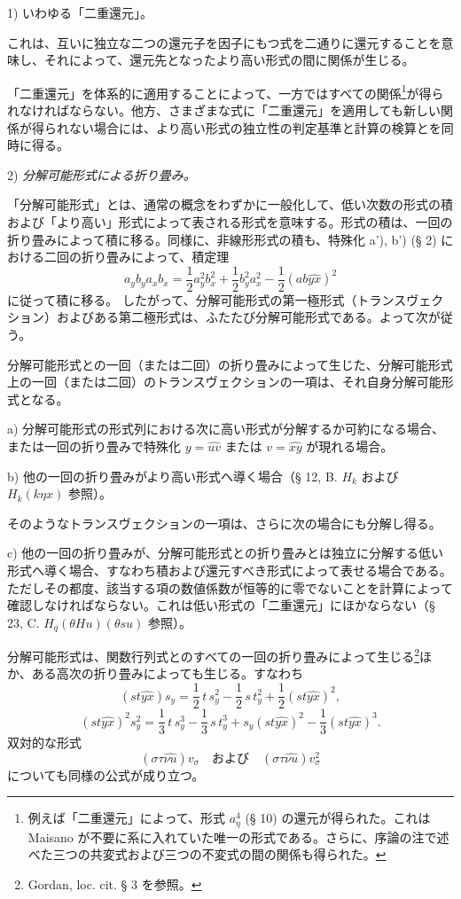 \documentclass[11pt]{article}
\begin{document}
1) いわゆる「二重還元」。

これは、互いに独立な二つの還元子を因子にもつ式を二通りに還元することを意味し、それによって、還元先となったより高い形式の間に関係が生じる。

「二重還元」を体系的に適用することによって、一方ではすべての関係\footnote{例えば「二重還元」によって、形式 $a_\eta^4$ (§ 10) の還元が得られた。これは Maisano が不要に系に入れていた唯一の形式である。さらに、序論の注で述べた三つの共変式および三つの不変式の間の関係も得られた。}が得られなければならない。他方、さまざまな式に「二重還元」を適用しても新しい関係が得られない場合には、より高い形式の独立性の判定基準と計算の検算とを同時に得る。

2) \emph{分解可能形式による折り畳み。}

「分解可能形式」とは、通常の概念をわずかに一般化して、低い次数の形式の積および「より高い」形式によって表される形式を意味する。形式の積は、一回の折り畳みによって積に移る。同様に、非線形形式の積も、特殊化 a'), b') (§ 2) における二回の折り畳みによって、積定理
\[
a_yb_y a_xb_x=\frac12a_y^2b_x^2+\frac12b_y^2a_x^2-\frac12(ab\widehat{yx})^2
\]
に従って積に移る。
したがって、分解可能形式の第一極形式（トランスヴェクション）およびある第二極形式は、ふたたび分解可能形式である。よって次が従う。

分解可能形式との一回（または二回）の折り畳みによって生じた、分解可能形式上の一回（または二回）のトランスヴェクションの一項は、それ自身分解可能形式となる。

a) 分解可能形式の形式列における次に高い形式が分解するか可約になる場合、または一回の折り畳みで特殊化 $y=\widehat{uv}$ または $v=\widehat{xy}$ が現れる場合。

b) 他の一回の折り畳みがより高い形式へ導く場合（§ 12, B. $H_k$ および $H_k(k\eta x)$ 参照）。

そのようなトランスヴェクションの一項は、さらに次の場合にも分解し得る。

c) 他の一回の折り畳みが、分解可能形式との折り畳みとは独立に分解する低い形式へ導く場合、すなわち積および還元すべき形式によって表せる場合である。ただしその都度、該当する項の数値係数が恒等的に零でないことを計算によって確認しなければならない。これは低い形式の「二重還元」にほかならない（§ 23, C. $H_q(\theta H u)(\theta s u)$ 参照）。

分解可能形式は、関数行列式とのすべての一回の折り畳みによって生じる\footnote{Gordan, loc. cit. § 3 を参照。}ほか、ある高次の折り畳みによっても生じる。すなわち
\[
(st\widehat{yx})s_y=\frac12\,t\,s_y^2-\frac12\,s\,t_y^2+\frac12(st\widehat{yx})^2,
\]
\[
(st\widehat{yx})^2s_y^2=\frac13\,t\,s_y^3-\frac13\,s\,t_y^3+s_y(st\widehat{yx})^2-\frac13(st\widehat{yx})^3.
\]
双対的な形式
\[
(\sigma\tau\widehat{\nu u})v_\sigma
\quad\text{および}\quad
(\sigma\tau\widehat{\nu u})v_\sigma^2
\]
についても同様の公式が成り立つ。
\end{document}
